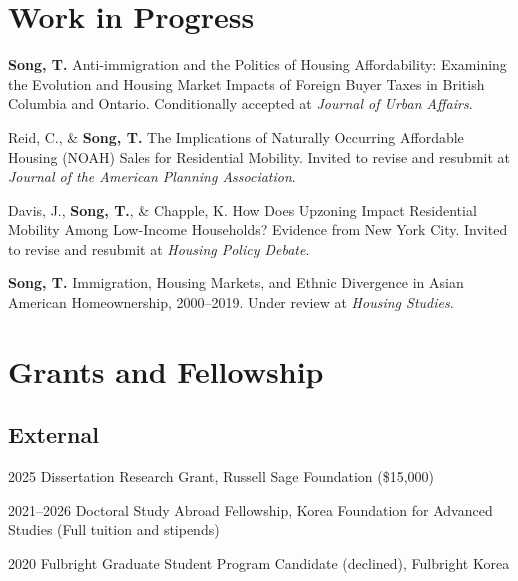 \documentclass[11pt,letterpaper]{article}
\newcommand{\money}[1]{(\$#1)}
\newcommand{\term}[1]{(#1)}
\begin{document}
\section{Work in Progress}
\begin{subpoints}
  \item \textbf{Song, T.} Anti-immigration and the Politics of Housing Affordability: Examining the Evolution and Housing Market Impacts of Foreign Buyer Taxes in British Columbia and Ontario. Conditionally accepted at \emph{Journal of Urban Affairs}.
  \item Reid, C., \& \textbf{Song, T.} The Implications of Naturally Occurring Affordable Housing (NOAH) Sales for Residential Mobility. Invited to revise and resubmit at \emph{Journal of the American Planning Association}.
  \item Davis, J., \textbf{Song, T.}, \& Chapple, K. How Does Upzoning Impact Residential Mobility Among Low-Income Households? Evidence from New York City. Invited to revise and resubmit at \emph{Housing Policy Debate}.
  \item \textbf{Song, T.} Immigration, Housing Markets, and Ethnic Divergence in Asian American Homeownership, 2000–2019. Under review at \emph{Housing Studies}.
\end{subpoints}

\section{Grants and Fellowship}

\subsection{External}
\begin{tablist}
  \item[2025] \tab{}Dissertation Research Grant, Russell Sage Foundation \money{15,000}
  \item[2021–2026] \tab{}Doctoral Study Abroad Fellowship, Korea Foundation for Advanced Studies \term{Full tuition and stipends}
  \item[2020] \tab{}Fulbright Graduate Student Program Candidate \term{declined}, Fulbright Korea
\end{tablist}
\end{document}
